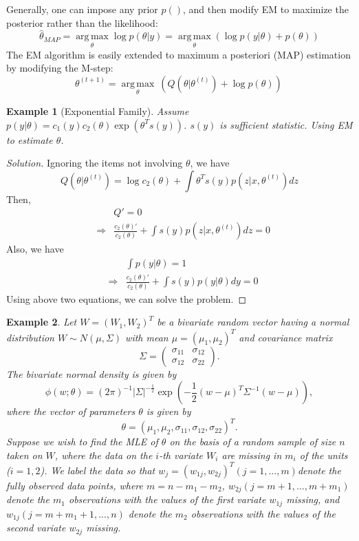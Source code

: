 \documentclass[11pt]{article}
\newtheorem{example}{Example}[section]
\begin{document}
Generally, one can impose any prior $p()$, and then modify EM to maximize the posterior rather than the likelihood:
$$
\hat{\theta}_{MAP} = \underset{\theta}{\operatorname{arg\,max}} \log p(\theta|y) = \underset{\theta}{\operatorname{arg\,max}}(\log p(y|\theta)+p(\theta))
$$
The EM algorithm is easily extended to maximum a posteriori (MAP)
estimation by modifying the M-step:
$$
        \theta^{(t+1)} = \underset{\theta}{\operatorname{arg\,max}} \ \left(Q(\theta|\theta^{(t)})+\log p(\theta)\right) \, 
$$
\begin{example}[Exponential Family]
Assume $p(y|\theta) = c_1(y)c_2(\theta)\exp(\theta^T s(y))$. $s(y)$ is sufficient statistic. Using EM to estimate $\theta$.
\end{example}
\begin{proof}[Solution]\let\qed\relax
Ignoring the items not involving $\theta$, we have 
$$
Q(\theta|\theta^{(t)}) = \log c_2(\theta) + \int \theta^Ts(y)p(z|x,\theta^{(t)})dz
$$
Then, 
\begin{eqnarray*}
&& Q' = 0 \\
&\Rightarrow& \frac{c_2(\theta)'}{c_2(\theta)} + \int s(y)p(z|x,\theta^{(t)})dz = 0
\end{eqnarray*}
Also, we have 
\begin{eqnarray*}
&& \int p(y|\theta) = 1 \\
&\Rightarrow& \frac{c_2(\theta)'}{c_2(\theta)} + \int s(y)p(y|\theta)dy = 0
\end{eqnarray*}
Using above two equations, we can solve the problem.
\end{proof}
\begin{example}
Let $W=(W_1, W_2)^T$ be a bivariate random vector having a normal distribution $W\sim N(\mu, \Sigma)$ with mean $\mu=(\mu_1,\mu_2)^T$ and covariance matrix $$\Sigma = \left(\begin{array}{cc}
\sigma_{11} & \sigma_{12}  \\ 
\sigma_{12}  & \sigma_{22} 
\end{array}\right). $$
The bivariate normal density is given by
$$
\phi(w;\theta) = (2\pi)^{-1}|\Sigma|^{-\frac{1}{2}}\exp(-\frac{1}{2}(w-\mu)^T\Sigma^{-1}(w-\mu)),
$$
where the vector of parameters $\theta$ is given by
$$
\theta=(\mu_1,\mu_2,\sigma_{11},\sigma_{12},\sigma_{22})^T.
$$
Suppose we wish to find the MLE of $\theta$ on the basis of a random sample of size $n$ taken on $W$, where the data on the $i$-th variate $W_i$ are missing in $m_i$ of the units ($i=1,2$). We label the data so that $w_j = (w_{1j}, w_{2j})^T (j=1, ..., m)$denote the fully observed data points, where $m = n-m_1-m_2$, $w_{2j}(j=m+1,...,m+m_1)$ denote the $m_1$ observations with the values of the first variate $w_{1j}$ missing, and $w_{1j}(j=m+m_1+1,...,n)$ denote the $m_2$ observations with the values of the second variate $w_{2j}$ missing.
\end{example}
\end{document}
